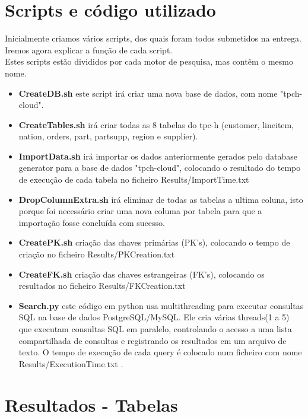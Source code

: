\documentclass{article}
\begin{document}
\section{Scripts e código utilizado}
\quad Inicialmente criamos vários scripts, dos quais foram todos submetidos na entrega. Iremos agora explicar a função de cada script.\\

\quad Estes scripts estão divididos por cada motor de pesquisa, mas contêm o mesmo nome.\\

\begin{itemize}
    \item \textbf{CreateDB.sh} este script irá criar uma nova base de dados, com nome "tpch-cloud".
    \item \textbf{CreateTables.sh} irá criar todas as 8 tabelas do tpc-h (customer, lineitem, nation, orders, part, partsupp, region e supplier).
    \item \textbf{ImportData.sh} irá importar os dados anteriormente gerados pelo database generator para a base de dados "tpch-cloud", colocando o resultado do tempo de execução de cada tabela no ficheiro Results/ImportTime.txt
    \item \textbf{DropColumnExtra.sh} irá eliminar de todas as tabelas a ultima coluna, isto porque foi necessário criar uma nova columa por tabela para que a importação fosse concluída com sucesso.
    \item \textbf{CreatePK.sh} criação das chaves primárias (PK's), colocando o tempo de criação no ficheiro Results/PKCreation.txt
    \item \textbf{CreateFK.sh} criação das chaves estrangeiras (FK's), colocando os resultados no ficheiro Results/FKCreation.txt
    \item \textbf{Search.py} este código em python usa multithreading para executar consultas SQL na base de dados PostgreSQL/MySQL. Ele cria várias threads(1 a 5) que executam consultas SQL em paralelo, controlando o acesso a uma lista compartilhada de consultas e registrando os resultados em um arquivo de texto. O tempo de execução de cada query é colocado num ficheiro com nome Results/ExecutionTime.txt .
     
\end{itemize}

\clearpage

\section{Resultados - Tabelas}
\end{document}
